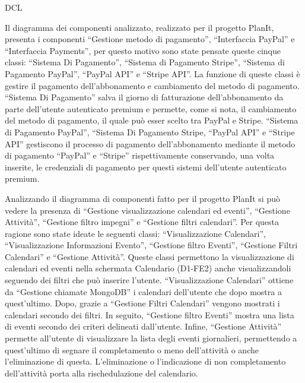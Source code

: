 \begin{listaPersonale}{DCL}
\begin{listaPersonale2}[DCL]{}
        Il diagramma dei componenti analizzato, realizzato per il progetto PlanIt, presenta i componenti “Gestione metodo di pagamento”, “Interfaccia PayPal” e “Interfaccia Payments”, per questo motivo sono state pensate queste cinque classi: “Sistema Di Pagamento”, “Sistema di Pagamento Stripe”, “Sistema di Pagamento PayPal”, “PayPal API” e “Stripe API”. La funzione di queste classi è gestire il pagamento dell'abbonamento e cambiamento del metodo di pagamento. “Sistema Di Pagamento” salva il giorno di fatturazione dell'abbonamento da parte dell'utente autenticato premium e  permette, come si nota, il cambiamento del metodo di pagamento, il quale può esser scelto tra PayPal e Stripe.
        “Sistema di Pagamento PayPal”, “Sistema Di Pagamento Stripe, “PayPal API” e “Stripe API” gestiscono il processo di pagamento dell'abbonamento mediante il metodo di pagamento “PayPal” e “Stripe” rispettivamente conservando, una volta inserite, le credenziali di pagamento per questi sistemi dell'utente autenticato premium.
        
        
            \begin{center}
                
            \end{center}
        
            
    \end{listaPersonale2}


    Analizzando il diagramma di componenti fatto per il progetto PlanIt si può vedere la presenza di “Gestione visualizzazione calendari ed eventi”, “Gestione Attività”, “Gestione filtro impegni” e “Gestione filtri calendari”. Per questa ragione sono state ideate le seguenti classi: “Visualizzazione Calendari”,  “Visualizzazione Informazioni Evento”, “Gestione filtro Eventi”, “Gestione Filtri Calendari” e “Gestione Attività”. Queste classi permettono la visualizzazione di calendari ed eventi nella schermata Calendario (D1-FE2) anche visualizzandoli seguendo dei filtri che può inserire l'utente.
    “Visualizzazione Calendari” ottiene da “Gestione chiamate MongoDB” i calendari dell'utente che dopo mostra a quest'ultimo. Dopo, grazie a “Gestione Filtri Calendari” vengono mostrati i calendari secondo dei filtri.
    In seguito, “Gestione filtro Eventi” mostra una lista di eventi secondo dei criteri delineati dall'utente.
    Infine, “Gestione Attività”  permette all'utente di visualizzare la lista degli eventi giornalieri, permettendo a quest'ultimo di segnare il completamento o meno dell'attività o anche l'eliminazione di questa. L'eliminazione o l'indicazione di non completamento dell'attività porta alla rischedulazione del calendario.
    

\end{listaPersonale}
